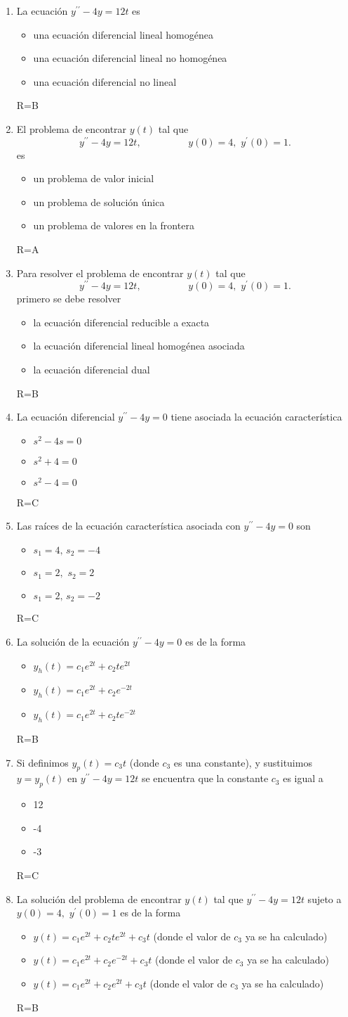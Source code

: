 \documentclass[12pt]{article}
\def\TresOp#1#2#3{
\begin{itemize}
\item[A)] #1
\item[B)] #2
\item[C)] #3
\end{itemize}
}
\begin{document}
\begin{enumerate}
\item La ecuación $y^{\prime\prime}-4y=12t$ es 
\TresOp{una ecuación diferencial lineal homogénea}
{una ecuación diferencial lineal no homogénea}
{una ecuación diferencial no lineal}
{\tiny R=B}
\item El problema de encontrar $y(t)$ tal que
\begin{equation}
y^{\prime\prime}-4y=12t,\hspace{2cm}y(0)=4,\,\,y^{\prime}(0)=1.
\label{EcuN15}
\end{equation}
es
\TresOp{un problema de valor inicial}
{un problema de solución única}
{un problema de valores en la frontera}
{\tiny R=A}
\item Para resolver el problema de encontrar $y(t)$ tal que
\begin{equation}
y^{\prime\prime}-4y=12t,\hspace{2cm}y(0)=4,\,\,y^{\prime}(0)=1.
\end{equation}
primero se debe resolver
\TresOp{la ecuación diferencial reducible a exacta}
{la ecuación diferencial lineal homogénea asociada}
{la ecuación diferencial dual}
{\tiny R=B}
\newpage
\item La ecuación diferencial $y^{\prime\prime}-4y=0$ tiene asociada la ecuación característica
\TresOp{$s^{2}-4s=0$}
{$s^{2}+4=0$}
{$s^{2}-4=0$}
{\tiny R=C}
\item Las raíces de la ecuación característica asociada con $y^{\prime\prime}-4y=0$ son
\TresOp{$s_{1}=4,\,s_{2}=-4$}
{$s_{1}=2,\,\,s_{2}=2$}
{$s_{1}=2,\,s_{2}=-2$}
{\tiny R=C}
\item La solución de la ecuación $y^{\prime\prime}-4y=0$ es de la forma
\TresOp{$y_{h}(t)=c_{1}e^{2t}+c_{2}te^{2t}$}
{$y_{h}(t)=c_{1}e^{2t}+c_{2}e^{-2t}$}
{$y_{h}(t)=c_{1}e^{2t}+c_{2}te^{-2t}$}
{\tiny R=B}
\item Si definimos $y_{p}(t)=c_{3}t$ (donde $c_{3}$ es una constante), y sustituimos $y=y_{p}(t)$ 
en $y^{\prime\prime}-4y=12t$ se encuentra que la constante $c_{3}$  es igual a
\TresOp{12}
{-4}
{-3}
{\tiny R=C}
\item La solución del problema de encontrar $y(t)$ tal que $y^{\prime\prime}-4y=12t$ sujeto a 
$y(0)=4,\,\,y^{\prime}(0)=1$ es de la forma
\TresOp{$y(t)=c_{1}e^{2t}+c_{2}te^{2t}+c_{3}t$ (donde el valor de $c_{3}$ ya se ha calculado)}
{$y(t)=c_{1}e^{2t}+c_{2}e^{-2t}+c_{3}t$ (donde el valor de $c_{3}$ ya se ha calculado)}
{$y(t)=c_{1}e^{2t}+c_{2}e^{2t}+c_{3}t$ (donde el valor de $c_{3}$ ya se ha calculado)}
{\tiny R=B}

\end{enumerate}
\end{document}
